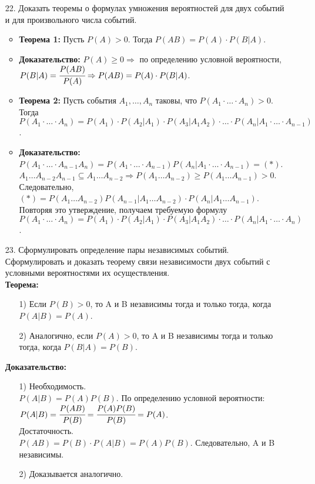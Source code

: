 \documentclass[a4paper]{article}
\begin{document}
\begin{enumerate}
\item[22.] Доказать теоремы о формулах умножения вероятностей для двух событий и для произвольного числа событий. \\
\begin{itemize}
\item \textbf{Теорема 1:} Пусть $P(A) > 0$. Тогда $P(AB) = P(A) \cdot P(B|A)$.
\item \textbf{Доказательство:} $P(A) \geqslant 0 \Rightarrow$ по определению условной вероятности, $P(B|A) = \cfrac{P(AB)}{P(A)} \Rightarrow P(AB) = P(A) \cdot P(B|A)$.
\item \textbf{Теорема 2:} Пусть события $A_1, \ldots, A_n$ таковы, что $P(A_1 \cdot \ldots \cdot A_n) > 0$. Тогда $P(A_1 \cdot \ldots \cdot A_n) = P(A_1) \cdot P(A_2|A_1) \cdot P(A_3|A_1 A_2) \cdot \ldots \cdot P(A_n|A_1 \cdot \ldots \cdot A_{n-1})$.
\item \textbf{Доказательство:} $P(A_1 \cdot \ldots \cdot A_{n-1} A_n) = P(A_1 \cdot \ldots \cdot A_{n-1}) P(A_n|A_1 \cdot \ldots \cdot A_{n-1}) = (*)$. \\
$A_1 \ldots A_{n-2} A_{n-1} \subseteq A_1 \ldots A_{n-2} \Rightarrow P(A_1 \ldots A_{n-2}) \geqslant P(A_1 \ldots A_{n-1}) > 0$. \\
Следовательно, $(*) = P(A_1 \ldots A_{n-2}) P(A_{n-1}|A_1 \ldots A_{n-2}) \cdot P(A_n|A_1 \ldots A_{n-1})$. Повторяя это утверждение, получаем требуемую формулу $P(A_1 \cdot \ldots \cdot A_n) = P(A_1) \cdot P(A_2|A_1) \cdot P(A_3|A_1 A_2) \cdot \ldots \cdot P(A_n|A_1 \cdot \ldots \cdot A_n)$.
\end{itemize}



\item[23.] Сформулировать определение пары независимых событий. Сформулировать и доказать теорему  связи независимости двух событий с условными вероятностями их осуществления. \\
\textbf{Теорема:} 
	\begin{enumerate}
	\item[1)] Если $P(B) > 0$, то A и B независимы тогда и только тогда, когда $P(A|B) = P(A)$.
	\item[2)] Аналогично, если $P(A) > 0$, то A и B независимы тогда и только тогда, когда $P(B|A) = P(B)$.
	\end{enumerate}
\textbf{Доказательство:} 
	\begin{enumerate}
	\item[1)] Необходимость. \\
	$P(A|B) = P(A) P(B)$. По определению условной вероятности: $P(A|B) = \cfrac{P(AB)}{P(B)} = \cfrac{P(A)P(B)}{P(B)} = P(A)$. \\
	Достаточность. \\
	$P(AB) = P(B) \cdot P(A|B) = P(A)P(B)$. Следовательно, A и B независимы.
	\item[2)] Доказывается аналогично.
	\end{enumerate}




\end{enumerate}
\end{document}
